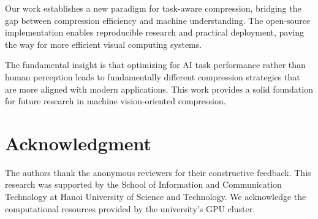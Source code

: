 \documentclass[conference]{IEEEtran}
\begin{document}
Our work establishes a new paradigm for task-aware compression, bridging the gap between compression efficiency and machine understanding. The open-source implementation enables reproducible research and practical deployment, paving the way for more efficient visual computing systems.

The fundamental insight is that optimizing for AI task performance rather than human perception leads to fundamentally different compression strategies that are more aligned with modern applications. This work provides a solid foundation for future research in machine vision-oriented compression.

\section*{Acknowledgment}

The authors thank the anonymous reviewers for their constructive feedback. This research was supported by the School of Information and Communication Technology at Hanoi University of Science and Technology. We acknowledge the computational resources provided by the university's GPU cluster.
\end{document}
